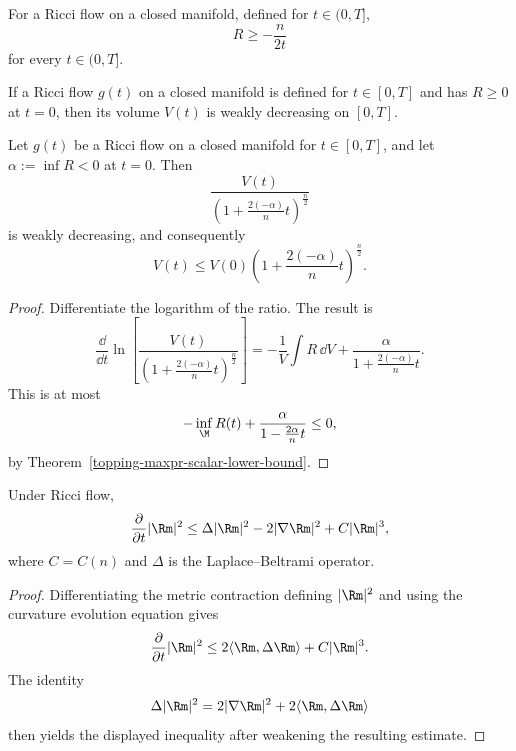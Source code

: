 \begin{corollary}
\label{topping-maxpr-negative-scalar-lower-bound}

For a Ricci flow on a closed manifold, defined for $t\in(0,T]$,
\[
R\geq-\frac{n}{2t}
\]
for every $t\in(0,T]$.
\end{corollary}

\begin{corollary}
\label{topping-maxpr-volume-decreases}


If a Ricci flow $g(t)$ on a closed manifold is defined for $t\in[0,T]$ and has
$R\geq0$ at $t=0$, then its volume $V(t)$ is weakly decreasing on $[0,T]$.
\end{corollary}

\begin{corollary}
\label{topping-maxpr-volume-ratio}


Let $g(t)$ be a Ricci flow on a closed manifold for $t\in[0,T]$, and let
$\alpha:=\inf R<0$ at $t=0$. Then
\[
\frac{V(t)}{\left(1+\frac{2(-\alpha)}{n}t\right)^{\frac n2}}
\]
is weakly decreasing, and consequently
\[
V(t)\leq V(0)\left(1+\frac{2(-\alpha)}{n}t\right)^{\frac n2}.
\]
\end{corollary}

\begin{proof}
\sketch Differentiate the logarithm of the ratio. The result is
\[
\frac{\dd}{\dd t}\ln\!\left[
\frac{V(t)}{\left(1+\frac{2(-\alpha)}{n}t\right)^{\frac n2}}
\right]
=-\frac{1}{V}\int R\,\dd V
 +\frac{\alpha}{1+\frac{2(-\alpha)}{n}t}.
\]
This is at most
\[
-\inf_{\M}R(t)+\frac{\alpha}{1-\frac{2\alpha}{n}t}\leq0,
\]
by Theorem~\ref{topping-maxpr-scalar-lower-bound}.
\end{proof}

\begin{proposition}
\label{topping-maxpr-curvature-norm-evolution}

Under Ricci flow,
\[
\frac{\partial}{\partial t}|\Rm|^2
\leq\Delta|\Rm|^2-2|\nabla\Rm|^2+C|\Rm|^3,
\]
where $C=C(n)$ and $\Delta$ is the Laplace--Beltrami operator.
\end{proposition}

\begin{proof}
\sketch Differentiating the metric contraction defining $|\Rm|^2$ and using
the curvature evolution equation gives
\[
\frac{\partial}{\partial t}|\Rm|^2
\leq2\langle\Rm,\Delta\Rm\rangle+C|\Rm|^3.
\]
The identity
\[
\Delta|\Rm|^2=2|\nabla\Rm|^2+2\langle\Rm,\Delta\Rm\rangle
\]
then yields the displayed inequality after weakening the resulting estimate.
\end{proof}

